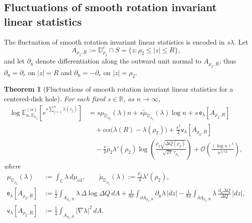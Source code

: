\documentclass[a4paper]{article}
\newtheorem{theorem}{Theorem}[section]
\newcommand{\C}{\mathbb{C}}
\newcommand{\R}{\mathbb{R}}
\numberwithin{equation}{section}
\begin{document}
\subsection{Fluctuations of smooth rotation invariant linear statistics}

The fluctuation of smooth rotation invariant linear statistics is encoded in $s\lambda$. 
Let
\[
A_{\rho_2,R}:=\mathbb D_{\rho_2}^{\mathrm c}\cap S
=\{z:\rho_2\leq |z|\leq R\},
\]
and let $\partial_{\mathrm n}$ denote differentiation along the outward unit
normal to $A_{\rho_2,R}$; thus $\partial_{\mathrm n}=\partial_r$ on
$|z|=R$ and $\partial_{\mathrm n}=-\partial_r$ on $|z|=\rho_2$.

\begin{theorem}[Fluctuations of smooth rotation invariant linear statistics for a centered-disk hole]
\label{theorem:smooth centered disk}
For each fixed $s\in\R$, as $n\to\infty$,
\begin{align}
\log \mathbb E_{n,\mathbb D_{\rho_2}}^{(\alpha)}
\!\left[e^{s\sum_{j=1}^n\lambda(z_j)}\right]
&=s\mu_{\mathbb D_{\rho_2}}(\lambda)n
+s\widetilde\mu_{\mathbb D_{\rho_2}}(\lambda)\log n
+s\,\mathsf e_\lambda[A_{\rho_2,R}]
\nonumber\\
&\quad
+\alpha s\bigl(\lambda(R)-\lambda(\rho_2)\bigr)
+\frac{s^2}{2}\mathsf v_\lambda[A_{\rho_2,R}]
\nonumber\\
&\quad
-\frac{s}{2}\rho_2\lambda'(\rho_2)
\log\!\left(
\frac{\rho_2\sqrt{\Delta Q(\rho_2)}}{\sqrt{2\pi}\,\tau_{\rho_2}}
\right)
+\mathcal O\!\left(\frac{(\log n)^3}{n^{1/12}}\right),
\end{align}
where
\begin{align}
\mu_{\mathbb D_{\rho_2}}(\lambda)
&:=\int_{\C}\lambda\,d\mu_{\mathrm{cd}},
\qquad
\widetilde\mu_{\mathbb D_{\rho_2}}(\lambda)
:=\frac{\rho_2}{4}\lambda'(\rho_2),
\\
\mathsf e_\lambda[A_{\rho_2,R}]
&:=\frac12\int_{A_{\rho_2,R}}\lambda\,\Delta\log\Delta Q\,dA
+\frac{1}{8\pi}\int_{\partial A_{\rho_2,R}}\partial_{\mathrm n}\lambda\,|dz|
-\frac{1}{8\pi}\int_{\partial A_{\rho_2,R}}
\lambda\,\frac{\partial_{\mathrm n}\Delta Q}{\Delta Q}\,|dz|,
\label{def:smooth-e-functional}
\\
\mathsf v_\lambda[A_{\rho_2,R}]
&:=\frac14\int_{A_{\rho_2,R}}|\nabla\lambda|^2\,dA.
\label{def:smooth-v-functional}
\end{align}
\end{theorem}
\end{document}
